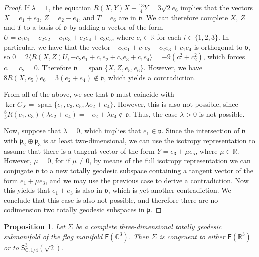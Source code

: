 \documentclass[11pt,a4paper,final]{amsart}
\newcommand{\s}{\mathsf}
\newcommand{\g}{\mathfrak}
\newcommand{\R}{\mathbb{R}}
\newcommand{\C}{\mathbb{C}}
\newcommand{\vecspan}{\operatorname{span}}
\newcommand{\spann}{\operatorname{span}}
\newtheorem{proposition}[theorem]{Proposition}
\theoremstyle{definition}
\begin{document}
\begin{proof}
	If $\lambda = 1$, the equation $R(X,Y)X+\frac{13}{4}Y=3\sqrt{2}e_{6}$ implies that the vectors $X=e_{1}+e_{3}$, $Z=e_{2}-e_{4}$, and $T=e_{6}$ are in $\g{v}$.
	We can therefore complete $X$, $Z$ and $T$ to a basis of $\g{v}$ by adding a vector of the form $U=c_{1}e_{1}+c_{2}e_{2}-c_{1}e_{3}+c_{2}e_{4}+c_{3}e_{5}$,
	where $c_i\in\R$ for each $i\in\{1,2,3\}$.
	In particular, we have that the vector $-c_{2}e_{1}+c_{1}e_{2}+c_{2}e_{3}+c_{1} e_{4}$ is orthogonal to $\g{v}$, so $0=2\langle R(X,Z)U,-c_{2}e_{1}+c_{1}e_{2}+c_{2}e_{3}+c_{1} e_{4}  \rangle=-9(c_{1}^{2}+c_{2}^{2})$, which
	forces $c_{1}=c_{2}=0$.
	Therefore $\g{v}=\spann\{X,Z,e_{5},e_{6}\}$.
	However, we have $8 R(X,e_{5})e_{6}=3(e_{2}+e_{4})\notin\g{v}$,	which yields a contradiction.
		
	From all of the above, we see that $\g{v}$ must coincide with $\ker C_{X}=\vecspan\{e_{1},e_{3},e_{5},\lambda e_{2}+e_{4}\}$.
	However, this is also not possible, since $\frac{8}{3}R(e_{1},e_{3})(\lambda e_{2}+e_{4})=-e_{2}+\lambda e_{4}\notin \g{v}$.
	Thus, the case $\lambda > 0$ is not possible.
		
	Now, suppose that $\lambda = 0$, which implies that $e_{1}\in \g{v}$.
	Since the intersection of $\g{v}$ with $\g{p}_{2}\oplus \g{p}_{3}$ is at least two-dimensional, we can use the isotropy representation to assume that there is a tangent vector of the form $Y=e_{3}+\mu e_{5}$, where $\mu \in \R$.
	However, $\mu=0$, for if $\mu \neq 0$, by means of the full isotropy representation we can conjugate $\g{v}$ to a new totally geodesic subspace containing a tangent vector of the form $e_{1}+\mu e_{3}$, and we may use the previous case to derive a contradiction.
	Now this yields that $e_{1}+e_{3}$ is also in $\g{v}$, which is yet another contradiction.
	We conclude that this case is also not possible, and therefore there are no codimension two totally geodesic subspaces in $\g{p}$. \qedhere
\end{proof}
	
\begin{proposition}
	\label{prop:3tgflag}
    Let $\Sigma$ be a complete three-dimensional totally geodesic submanifold of the flag manifold $\s{F}(\C^3)$.
	Then $\Sigma$ is congruent to either $\mathsf{F}(\R^{3})$ or to $\mathsf{S}^{3}_{\C,1/4}(\sqrt{2})$.
\end{proposition}
	
\end{document}
